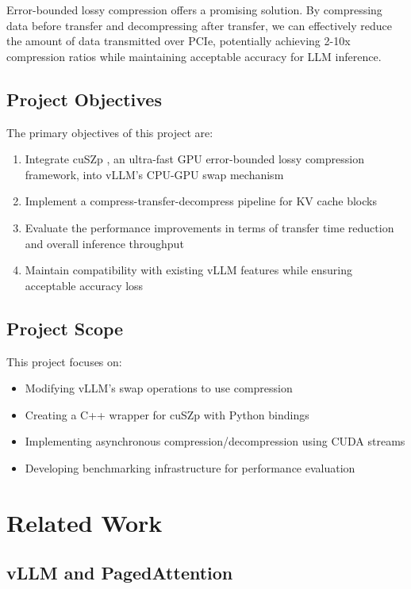 \documentclass{polyu-comp}
\begin{document}
Error-bounded lossy compression offers a promising solution. By compressing data before transfer and decompressing after transfer, we can effectively reduce the amount of data transmitted over PCIe, potentially achieving 2-10x compression ratios while maintaining acceptable accuracy for LLM inference.

\section{Project Objectives}
The primary objectives of this project are:

\begin{enumerate}
    \item Integrate cuSZp \cite{huang2023cuszp}, an ultra-fast GPU error-bounded lossy compression framework, into vLLM's CPU-GPU swap mechanism
    \item Implement a compress-transfer-decompress pipeline for KV cache blocks
    \item Evaluate the performance improvements in terms of transfer time reduction and overall inference throughput
    \item Maintain compatibility with existing vLLM features while ensuring acceptable accuracy loss
\end{enumerate}

\section{Project Scope}
This project focuses on:
\begin{itemize}
    \item Modifying vLLM's swap operations to use compression
    \item Creating a C++ wrapper for cuSZp with Python bindings
    \item Implementing asynchronous compression/decompression using CUDA streams
    \item Developing benchmarking infrastructure for performance evaluation
\end{itemize}


\chapter{Related Work}

\section{vLLM and PagedAttention}
\end{document}
